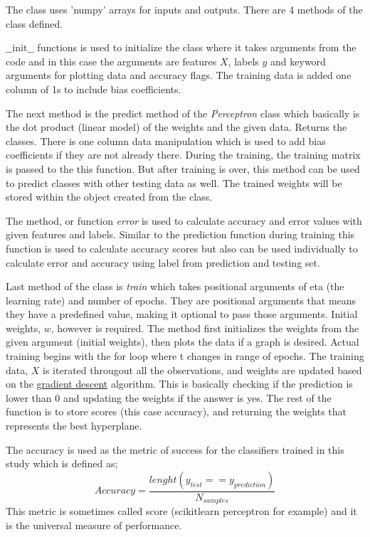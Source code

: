 \documentclass[11pt]{article}
\begin{document}
The class uses 'numpy' arrays for inputs and outputs. There are 4 methods of the class defined. \medskip

$\_\_$init$\_\_$ functions is used to initialize the class where it takes arguments from the code and in this case the arguments are features $X$, labels $y$ and keyword arguments for plotting data and accuracy flags. The training data is added one column of 1s to include bias coefficients.\medskip

The next method is the predict method of the \emph{Perceptron} class which basically is the dot product (linear model) of the weights and the given data. Returns the classes. There is one column data manipulation which is used to add bias coefficients if they are not already there. During the training, the training matrix is passed to the this function. But after training is over, this method can be used to predict classes with other testing data as well. The trained weights will be stored within the object created from the class. \medskip

The method, or function \emph{error} is used to calculate accuracy and error values with given features and labels. Similar to the prediction function during training this function is used to calculate accuracy scores but also can be used individually to calculate error and accuracy using label from prediction and testing set.\medskip

Last method of the class is \emph{train} which takes positional arguments of eta (the learning rate) and number of epochs. They are positional arguments that means they have a predefined value, making it optional to pass those arguments. Initial weights, $w$, however is required. The method first initializes the weights from the given argument (initial weights), then plots the data if a graph is desired. Actual training begins with the for loop where t changes in range of epochs. The training data, $X$ is iterated througout all the observations, and weights are updated based on the \underline{gradient descent} algorithm. This is basically checking if the prediction is lower than 0 and updating the weights if the answer is yes. The rest of the function is to store scores (this case accuracy), and returning the weights that represents the best hyperplane. \medskip

The accuracy is used as the metric of success for the classifiers trained in this study which is defined as;
$$
Accuracy = \frac{lenght(y_{test} == y_{prediction})}{N_{samples}}
$$
This metric is sometimes called score (scikitlearn perceptron for example) and it is the universal measure of performance.
\end{document}
